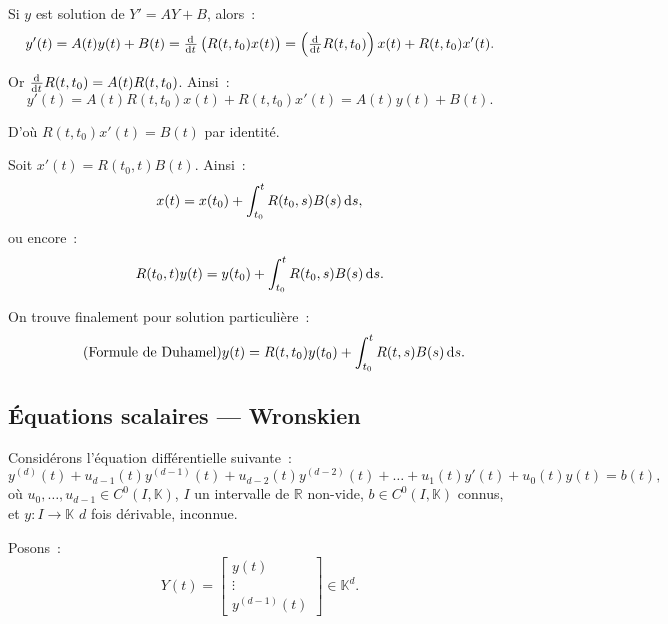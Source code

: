 \documentclass{report}
\theoremstyle{definition}
\theoremstyle{remark}
\numberwithin{equation}{section}
\newcommand{\K}{\mathbb K}
\newcommand{\R}{\mathbb R}
\begin{document}
			Si $y$ est solution de $Y' = AY + B$, alors~:
			\begin{equation}
				y'(t) = A(t)y(t) + B(t) = \od{}t \left(R(t, t_0)x(t)\right) = \left(\od{}t R(t, t_0)\right)x(t) + R(t, t_0)x'(t).
			\end{equation}

			Or $\od{}t R(t, t_0) = A(t)R(t, t_0)$. Ainsi~:
			\begin{equation}
				y'(t) = A(t)R(t, t_0)x(t) + R(t, t_0)x'(t) = A(t)y(t) + B(t).
			\end{equation}

			D'où $R(t, t_0)x'(t) = B(t)$ par identité.

			Soit $x'(t) = R(t_0, t)B(t)$. Ainsi~:
			\begin{equation}
				x(t) = x(t_0) + \int_{t_0}^tR(t_0, s)B(s)\dif s,
			\end{equation}
			ou encore~:
			\begin{equation}
				R(t_0, t)y(t) = y(t_0) + \int_{t_0}^tR(t_0, s)B(s)\dif s.
			\end{equation}

			On trouve finalement pour solution particulière~:
			\begin{align}\tag{Formule de Duhamel}
				y(t) = R(t, t_0)y(t_0) + \int_{t_0}^tR(t, s)B(s)\dif s.
			\end{align}

		\subsection{Équations scalaires --- Wronskien}
			Considérons l'équation différentielle suivante~:
			\begin{equation}
				y^{(d)}(t) + u_{d-1}(t)y^{(d-1)}(t) + u_{d-2}(t)y^{(d-2)}(t) + \ldots + u_1(t)y'(t) + u_0(t)y(t) = b(t),
			\end{equation}
			où $u_0, \ldots, u_{d-1} \in C^0(I, \K)$, $I$ un intervalle de $\R$ non-vide, $b \in C^0(I, \K)$ connus, et $y : I \to \K$ $d$ fois dérivable, inconnue.

			Posons~:
			\begin{equation}
				Y(t)  = \begin{bmatrix}y(t) \\ \vdots \\ y^{(d-1)}(t)\end{bmatrix} \in \K^d.
			\end{equation}
\end{document}
